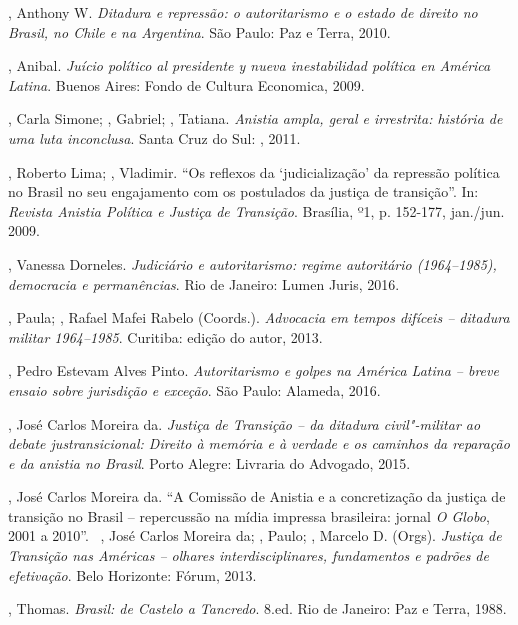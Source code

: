 \begin{Parskip}
, Anthony W. \emph{Ditadura e repressão: o autoritarismo e o
estado de direito no Brasil, no Chile e na Argentina}. São Paulo: Paz e
Terra, 2010.

, Anibal. \emph{Juício político al presidente y nueva
inestabilidad política en América Latina}. Buenos Aires: Fondo de
Cultura Economica, 2009.

, Carla Simone; , Gabriel; , Tatiana.
\emph{Anistia ampla, geral e irrestrita: história de uma luta
inconclusa}. Santa Cruz do Sul: , 2011.

, Roberto Lima;  , Vladimir. ``Os reflexos da
`judicialização' da repressão política no Brasil no seu engajamento com
os postulados da justiça de transição''. In: \emph{Revista Anistia
Política e Justiça de Transição}. Brasília, º1, p. 152-177, jan./jun.
2009.

, Vanessa Dorneles. \emph{Judiciário e autoritarismo: regime
autoritário (1964--1985), democracia e permanências}. Rio de Janeiro:
Lumen Juris, 2016.

, Paula; , Rafael Mafei Rabelo (Coords.).
\emph{Advocacia em tempos difíceis -- ditadura militar 1964--1985}.
Curitiba: edição do autor, 2013.

, Pedro Estevam Alves Pinto. \emph{Autoritarismo e golpes na
América Latina -- breve ensaio sobre jurisdição e exceção}. São Paulo:
Alameda, 2016.

 , José Carlos Moreira da. \emph{Justiça de Transição -- da
ditadura civil"-militar ao debate justransicional: Direito à memória e à
verdade e os caminhos da reparação e da anistia no Brasil}. Porto Alegre:
Livraria do Advogado, 2015.

 , José Carlos Moreira da. ``A Comissão de Anistia e a
concretização da justiça de transição no Brasil -- repercussão na mídia
impressa brasileira: jornal \emph{O Globo}, 2001 a 2010''.~ , José
Carlos Moreira da; , Paulo; , Marcelo D. (Orgs).
\emph{Justiça de Transição nas Américas -- olhares interdisciplinares,
fundamentos e padrões de efetivação}. Belo Horizonte: Fórum, 2013.

, Thomas. \emph{Brasil: de Castelo a Tancredo}. 8.ed. Rio de
Janeiro: Paz e Terra, 1988.


\end{Parskip}
